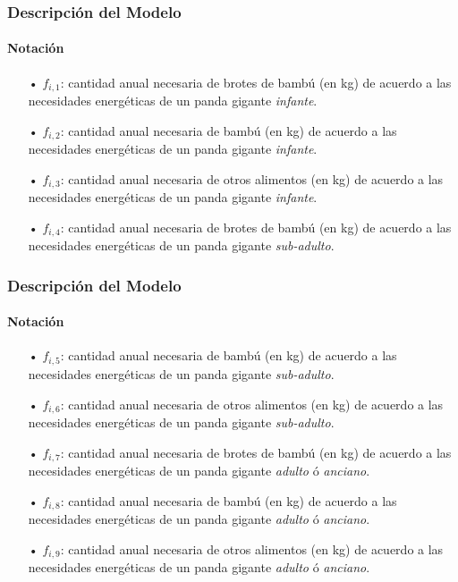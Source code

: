 \documentclass[10pt,a4paper]{beamer}
\theoremstyle{definition}
\theoremstyle{remark}
\begin{document}
\begin{frame}
\frametitle{Descripción del Modelo}
\framesubtitle{Notación}
\begin{small}
\begin{itemize}
\item[•] $f_{i,1}$: cantidad anual necesaria de brotes de bambú (en kg) de acuerdo a las necesidades energéticas de un panda gigante \textit{infante}.
\item[•] $f_{i,2}$: cantidad anual necesaria de bambú (en kg) de acuerdo a las necesidades energéticas de un panda gigante \textit{infante}.
\item[•] $f_{i,3}$: cantidad anual necesaria de otros alimentos (en kg) de acuerdo a las necesidades energéticas de un panda gigante \textit{infante}.
\item[•] $f_{i,4}$: cantidad anual necesaria de brotes de bambú (en kg) de acuerdo a las necesidades energéticas de un panda gigante \textit{sub-adulto}.
\end{itemize}
\end{small}
\end{frame}

\begin{frame}
\frametitle{Descripción del Modelo}
\framesubtitle{Notación}
\begin{small}
\begin{itemize}
\item[•] $f_{i,5}$: cantidad anual necesaria de bambú (en kg) de acuerdo a las necesidades energéticas de un panda gigante \textit{sub-adulto}.
\item[•] $f_{i,6}$: cantidad anual necesaria de otros alimentos (en kg) de acuerdo a las necesidades energéticas de un panda gigante \textit{sub-adulto}.
\item[•] $f_{i,7}$: cantidad anual necesaria de brotes de bambú (en kg) de acuerdo a las necesidades energéticas de un panda gigante \textit{adulto} ó \textit{anciano}.
\item[•] $f_{i,8}$: cantidad anual necesaria de bambú (en kg) de acuerdo a las necesidades energéticas de un panda gigante \textit{adulto} ó \textit{anciano}.
\item[•] $f_{i,9}$: cantidad anual necesaria de otros alimentos (en kg) de acuerdo a las necesidades energéticas de un panda gigante \textit{adulto} ó \textit{anciano}.
\end{itemize}
\end{small}
\end{frame}
\end{document}
